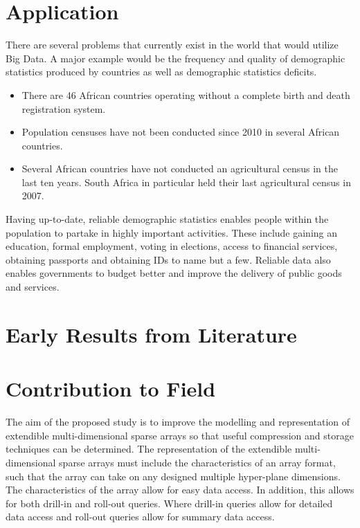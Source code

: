 \section{Application}
There are several problems that currently exist in the world that would utilize Big Data. A major example would be the frequency and quality of demographic statistics produced by countries as well as demographic statistics deficits.
\begin{itemize}
	\item There are 46 African countries operating without a complete birth and death registration system.
	\item Population censuses have not been conducted since 2010 in several African countries.
	\item Several African countries have not conducted an agricultural census in the last ten years. South Africa in particular held their last agricultural census in 2007.
\end{itemize}

Having up-to-date, reliable demographic statistics enables people within the population to partake in highly important activities. These include gaining an education, formal employment, voting in elections, access to financial services, obtaining passports and obtaining IDs to name but a few. Reliable data also enables governments to budget better and improve the delivery of public goods and services.

\section{Early Results from Literature}


\section{Contribution to Field}
The aim of the proposed study is to improve the modelling and representation of extendible multi-dimensional sparse arrays so that useful compression and storage techniques can be determined. The representation of the extendible multi-dimensional sparse arrays must include the characteristics of an array format, such that the array can take on any designed multiple hyper-plane dimensions. The characteristics of the array allow for easy data access. In addition, this allows for both drill-in and roll-out queries. Where drill-in queries allow for detailed data access and roll-out queries allow for summary data access.

